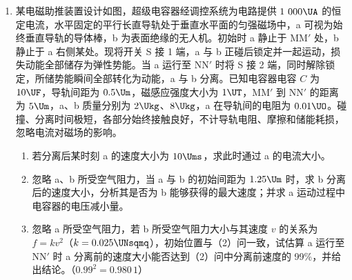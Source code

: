 \documentclass[\gkver]{gaokaozhenti}
\begin{document}
\begin{enumerate}
\onepicture[align=right, w=8.53cm]{}


\item
某电磁助推装置设计如图，超级电容器经调控系统为电路提供 $1\ 000\UA$ 的恒定电流，水平固定的平行长直导轨处于垂直水平面的匀强磁场中，a 可视为始终垂直导轨的导体棒，b 为表面绝缘的无人机。初始时 a 静止于 MM$'$ 处，b 静止于 a 右侧某处。现将开关 S 接 1 端，a 与 b 正碰后锁定并一起运动，损失动能全部储存为弹性势能。当 a 运行至 NN$'$ 时将 S 接 2 端，同时解除锁定，所储势能瞬间全部转化为动能，a 与 b 分离。已知电容器电容 $C$ 为 $10\UF$，导轨间距为 $0.5\Um$，磁感应强度大小为 $1\UT$，MM$'$ 到 NN$'$ 的距离为 $5\Um$，a、b 质量分别为 $2\Ukg$、$8\Ukg$，a 在导轨间的电阻为 $0.01\UO$。碰撞、分离时间极短，各部分始终接触良好，不计导轨电阻、摩擦和储能耗损，忽略电流对磁场的影响。
\begin{enumerate}
\item
若分离后某时刻 a 的速度大小为 $10\Ums$，求此时通过 a 的电流大小。
\item
忽略 a、b 所受空气阻力，当 a 与 b 的初始间距为 $1.25\Um$ 时，求 b 分离后的速度大小，分析其是否为 b 能够获得的最大速度；并求 a 运动过程中电容器的电压减小量。
\item
忽略 a 所受空气阻力，若 b 所受空气阻力大小与其速度 $v$ 的关系为 $f = kv^{2}$（$k = 0.025\UNsqmq$），初始位置与（2）问一致，试估算 a 运行至 NN$'$ 时 a 分离前的速度大小能否达到（2）问中分离前速度的 99\%，并给出结论。（$0.99^{2} = 0.980\,1$）
\end{enumerate}


\end{enumerate}
\end{document}
